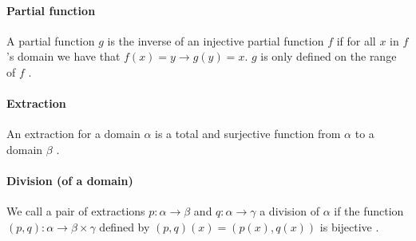 \paragraph{Partial function} A partial function $g$ is the inverse of an injective partial function $f$ if for all $x$ in $f$’s domain we have that $f(x) = y \to g(y) = x$. $g$ is only defined on the range of $f$ \cite{Guarded}.

\paragraph{Extraction} An extraction for a domain $\alpha$ is a total and surjective function from $\alpha$ to
a domain $\beta$ \cite{Guarded}.

\paragraph{Division (of a domain)} We call a pair of extractions $p:\alpha \to \beta$ and $q: \alpha \to \gamma$ a division of $\alpha$ if the function $(p,q):\alpha\to\beta\times\gamma$ defined by $(p,q) (x) = (p(x), q(x))$ is bijective \cite{Guarded}.






